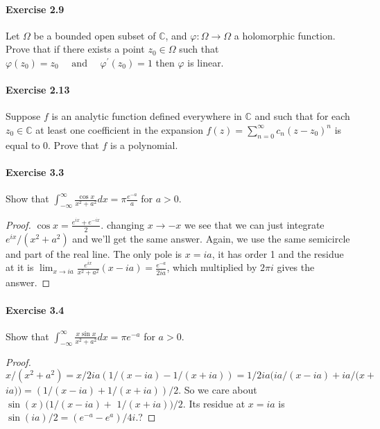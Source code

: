 \documentclass{article}
\begin{document}
\paragraph{Exercise 2.9} Let $\Omega$ be a bounded open subset of $\mathbb{C}$, and $\varphi: \Omega \rightarrow \Omega$ a holomorphic function. Prove that if there exists a point $z_{0} \in \Omega$ such that $\varphi\left(z_{0}\right)=z_{0} \quad \text { and } \quad \varphi^{\prime}\left(z_{0}\right)=1$ then $\varphi$ is linear.


\paragraph{Exercise 2.13} Suppose $f$ is an analytic function defined everywhere in $\mathbb{C}$ and such that for each $z_0 \in \mathbb{C}$ at least one coefficient in the expansion $f(z) = \sum_{n=0}^\infty c_n(z - z_0)^n$ is equal to 0. Prove that $f$ is a polynomial.


\paragraph{Exercise 3.3} Show that $ \int_{-\infty}^{\infty} \frac{\cos x}{x^2 + a^2} dx = \pi \frac{e^{-a}}{a}$ for $a > 0$.
\begin{proof}
    $\cos x=\frac{e^{i x}+e^{-i x}}{2}$. changing $x \rightarrow-x$ we see that we can just integrate $e^{i x} /\left(x^2+a^2\right)$ and we'll get the same answer. Again, we use the same semicircle and part of the real line. The only pole is $x=i a$, it has order 1 and the residue at it is $\lim _{x \rightarrow i a} \frac{e^{i x}}{x^2+a^2}(x-i a)=\frac{e^{-a}}{2 i a}$, which multiplied by $2 \pi i$ gives the answer.
\end{proof}



\paragraph{Exercise 3.4} Show that $ \int_{-\infty}^{\infty} \frac{x \sin x}{x^2 + a^2} dx = \pi e^{-a}$ for $a > 0$.
\begin{proof}
$$
x /\left(x^2+a^2\right)=x / 2 i a(1 /(x-i a)-1 /(x+i a))=1 / 2 i a(i a /(x-i a)+i a /(x+
$$
$i a))=(1 /(x-i a)+1 /(x+i a)) / 2$. So we care about $\sin (x)(1 /(x-i a)+$ $1 /(x+i a)) / 2$. Its residue at $x=i a$ is $\sin (i a) / 2=\left(e^{-a}-e^a\right) / 4 i$.?
\end{proof}
\end{document}

